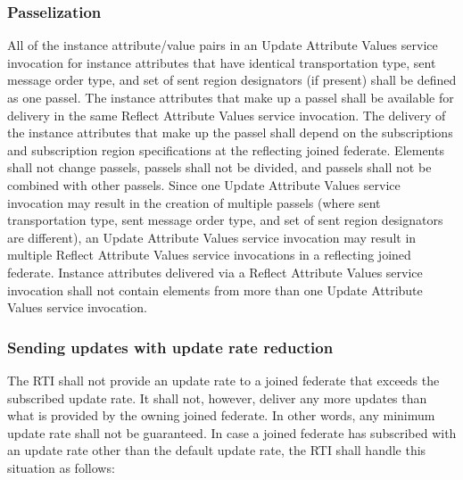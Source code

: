 \begin{compactstdpage}
    \subsubsection{Passelization}


    All of the instance attribute/value pairs in an Update Attribute Values service invocation for instance attributes that have identical transportation type, sent message order type, and set of sent region designators (if present) shall be defined as one passel. The instance attributes that make up a passel shall be available for delivery in the same Reflect Attribute Values service invocation. The delivery of the instance attributes that make up the passel shall depend on the subscriptions and subscription region specifications at the reflecting joined federate. Elements shall not change passels, passels shall not be divided, and passels shall not be combined with other passels. Since one Update Attribute Values service invocation may result in the creation of multiple passels (where sent transportation type, sent message order type, and set of sent region designators are different), an Update Attribute Values service invocation may result in multiple Reflect Attribute Values service invocations in a reflecting joined federate. Instance attributes delivered via a Reflect Attribute Values service invocation shall not contain elements from more than one Update Attribute Values service invocation.

    \subsubsection{Sending updates with update rate reduction}


    The RTI shall not provide an update rate to a joined federate that exceeds the subscribed update rate. It shall not, however, deliver any more updates than what is provided by the owning joined federate. In other words, any minimum update rate shall not be guaranteed. In case a joined federate has subscribed with an update rate other than the default update rate, the RTI shall handle this situation as follows:

\end{compactstdpage}

\clearpage

